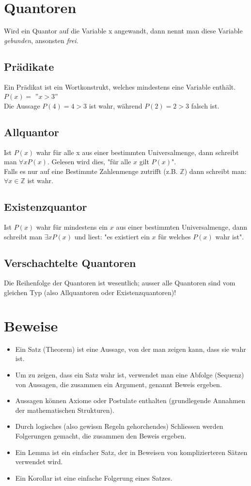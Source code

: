 \documentclass[12pt]{scrartcl}
\begin{document}
\section{Quantoren}
Wird ein Quantor auf die Variable x angewandt, dann nennt man diese Variable \textit{gebunden}, ansonsten \textit{frei}.
\subsection{Prädikate}
Ein Prädikat ist ein Wortkonstrukt, welches mindestens eine Variable enthält.\\
$P(x) =$ ''$x > 3$''\\
Die Aussage $P(4) = 4 > 3$ ist wahr, während $P(2) = 2 > 3$ falsch ist.

\subsection{Allquantor}
Ist $P(x)$ wahr für alle x aus einer bestimmten Universalmenge, dann schreibt man $\forall x P(x)$.
Gelesen wird dies, "für alle $x$ gilt $P(x)$".\\
Falls es nur auf eine Bestimmte Zahlenmenge zutrifft (z.B. $\mathbb{Z}$) dann schreibt man:\\
$\forall x \in \mathbb{Z}$ ist wahr.

\subsection{Existenzquantor}
Ist $P(x)$ wahr für mindestens ein $x$ aus einer bestimmten Universalmenge, dann schreibt man $\exists x P(x)$
und liest: "es existiert ein $x$ für welches $P(x)$ wahr ist".


\subsection{Verschachtelte Quantoren}
Die Reihenfolge der Quantoren ist wesentlich; ausser alle Quantoren sind vom gleichen Typ (also Allquantoren oder Existenzquantoren)!


\newpage
\section{Beweise}
\begin{itemize}
    \item Ein Satz (Theorem) ist eine Aussage, von der man zeigen kann, dass sie wahr ist.
    \item Um zu zeigen, dass ein Satz wahr ist, verwendet man eine Abfolge (Sequenz) von Aussagen, die zusammen ein Argument, genannt Beweis ergeben.
    \item Aussagen können Axiome oder Postulate enthalten (grundlegende Annahmen der mathematischen Strukturen).
    \item Durch logisches (also gewissn Regeln gehorchendes) Schliessen werden Folgerungen gemacht, die zusammen den Beweis ergeben.
    \item Ein Lemma ist ein einfacher Satz, der in Beweisen von komplizierteren Sätzen verwendet wird.
    \item Ein Korollar ist eine einfache Folgerung eines Satzes.
\end{itemize}
\end{document}
